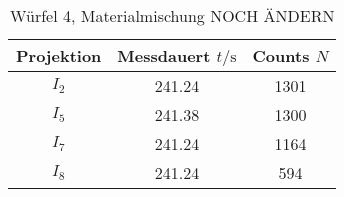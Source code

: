 \FloatBarrier
\noindent
\FloatBarrier
\begin{table}[h]
    \centering
    \caption{Würfel 4, Materialmischung NOCH ÄNDERN}
    \label{tab:W4}
    \begin{tabular}{c c c}
        \toprule
        {Projektion} & {Messdauert $t/\si{\s}$} & {Counts $N$}\\
        \midrule
        $I_2$ & 241.24 & 1301 \\
        $I_5$ & 241.38 & 1300 \\
        $I_7$ & 241.24 & 1164 \\
        $I_8$ & 241.24 & 594 \\
        \bottomrule
    \end{tabular}
\end{table}
\FloatBarrier
\noindent